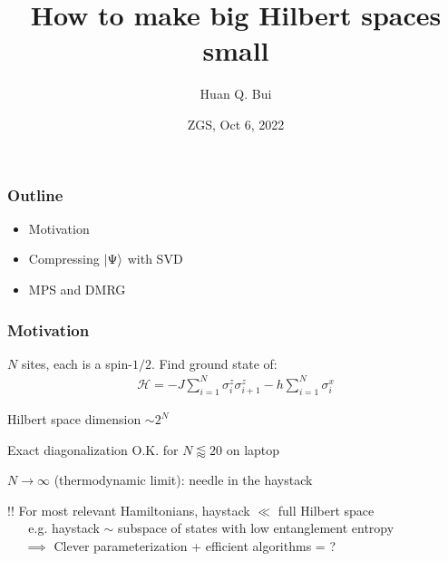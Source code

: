 \documentclass{beamer}
\title[\textcolor{white}{{}}]
{
	How to make big Hilbert spaces small
}
\author[Bui] %
{Huan Q. Bui
	}
\institute[MIT] %
{
}
\date{ZGS, Oct 6, 2022}
\theoremstyle{definition}
\begin{document}
 
\frame{\titlepage}


\begin{frame}
	\frametitle{Outline}
	\begin{itemize}
		\item Motivation
		\item Compressing $\ket{\Psi}$ with SVD
		\item MPS and DMRG
	\end{itemize}
\end{frame}


\begin{frame}
	\frametitle{Motivation}
	
	$N$ sites, each is a spin-$1/2$. Find ground state of:
	\begin{align*}
		\mathcal{H} = - J \sum_{i=1}^N \sigma_i^z \sigma_{i+1}^z - h \sum_{i=1}^N \sigma^x_i
	\end{align*}	
	
	
	Hilbert space dimension $\sim 2^N$\\
	
	\vspace{8pt}
	
	Exact diagonalization O.K. for $N \lessapprox 20$ on laptop\\
	
	\vspace{8pt}
	
	$N \to \infty$ (thermodynamic limit): needle in the haystack\\
	
	\vspace{8pt}
	
	{$\boxed{!!}$ For most relevant Hamiltonians, haystack $\ll$ full Hilbert space }\\
	\vspace{2pt}
	{$\quad\,\,\,\,$e.g. haystack $\sim$ subspace of states with low entanglement entropy }\\
	\vspace{2pt}
	{$\quad\,\,\implies$ Clever parameterization + efficient algorithms = \smiley{}?}
	
		
	
\end{frame}
\end{document}

